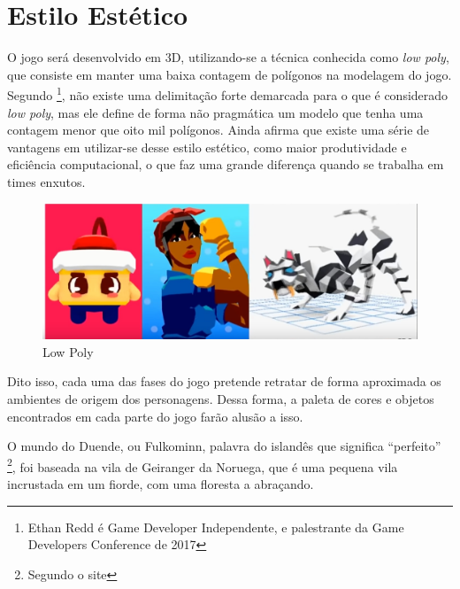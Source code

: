 \section{Estilo Estético}
O jogo será desenvolvido em 3D, utilizando-se a técnica conhecida como \textit{low poly}, que consiste em manter uma baixa contagem de polígonos na modelagem do jogo. Segundo  \footnote{Ethan Redd é Game Developer Independente, e palestrante da Game Developers Conference de 2017}, não existe uma delimitação forte demarcada para o que é considerado \textit{low poly}, mas ele define de forma não pragmática um modelo que tenha uma contagem menor que oito mil polígonos. Ainda afirma que existe uma série de vantagens em utilizar-se desse estilo estético, como maior produtividade e eficiência computacional, o que faz uma grande diferença quando se trabalha em times enxutos.

\begin{figure}[htb]
    \caption{\label{fig_lowpoly}Low Poly}
    \begin{center}
        \includegraphics[width=\textwidth]{imagens/lowPoly.jpg}
    \end{center}
\end{figure}

Dito isso, cada uma das fases do jogo pretende retratar de forma aproximada os ambientes de origem dos personagens. Dessa forma, a paleta de cores e objetos encontrados em cada parte do jogo farão alusão a isso.

O mundo do Duende, ou Fulkominn, palavra do islandês que significa ``perfeito'' \footnote{Segundo o site }, foi baseada na vila de Geiranger da Noruega, que é uma pequena vila incrustada em um fiorde, com uma floresta a abraçando.

\clearpage

